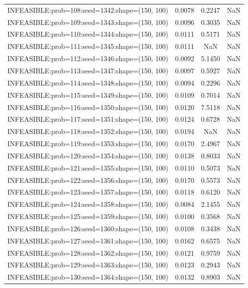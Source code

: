 \begin{longtable}{lccc}
INFEASIBLE:prob=108:seed=1342:shape=(150, 100) & 0.0078 &  0.2247 &    NaN \\
INFEASIBLE:prob=109:seed=1343:shape=(150, 100) & 0.0096 &  0.3035 &    NaN \\
INFEASIBLE:prob=110:seed=1344:shape=(150, 100) & 0.0111 &  0.5171 &    NaN \\
INFEASIBLE:prob=111:seed=1345:shape=(150, 100) & 0.0111 &     NaN &    NaN \\
INFEASIBLE:prob=112:seed=1346:shape=(150, 100) & 0.0092 &  5.1450 &    NaN \\
INFEASIBLE:prob=113:seed=1347:shape=(150, 100) & 0.0097 &  0.5927 &    NaN \\
INFEASIBLE:prob=114:seed=1348:shape=(150, 100) & 0.0094 &  0.2296 &    NaN \\
INFEASIBLE:prob=115:seed=1349:shape=(150, 100) & 0.0109 &  0.7014 &    NaN \\
INFEASIBLE:prob=116:seed=1350:shape=(150, 100) & 0.0120 &  7.5118 &    NaN \\
INFEASIBLE:prob=117:seed=1351:shape=(150, 100) & 0.0124 &  0.6728 &    NaN \\
INFEASIBLE:prob=118:seed=1352:shape=(150, 100) & 0.0194 &     NaN &    NaN \\
INFEASIBLE:prob=119:seed=1353:shape=(150, 100) & 0.0170 &  2.4967 &    NaN \\
INFEASIBLE:prob=120:seed=1354:shape=(150, 100) & 0.0138 &  0.8033 &    NaN \\
INFEASIBLE:prob=121:seed=1355:shape=(150, 100) & 0.0110 &  0.5073 &    NaN \\
INFEASIBLE:prob=122:seed=1356:shape=(150, 100) & 0.0170 &  0.5573 &    NaN \\
INFEASIBLE:prob=123:seed=1357:shape=(150, 100) & 0.0118 &  0.6120 &    NaN \\
INFEASIBLE:prob=124:seed=1358:shape=(150, 100) & 0.0084 &  2.1455 &    NaN \\
INFEASIBLE:prob=125:seed=1359:shape=(150, 100) & 0.0100 &  0.3568 &    NaN \\
INFEASIBLE:prob=126:seed=1360:shape=(150, 100) & 0.0108 &  0.3438 &    NaN \\
INFEASIBLE:prob=127:seed=1361:shape=(150, 100) & 0.0162 &  0.6575 &    NaN \\
INFEASIBLE:prob=128:seed=1362:shape=(150, 100) & 0.0121 &  0.9759 &    NaN \\
INFEASIBLE:prob=129:seed=1363:shape=(150, 100) & 0.0123 &  0.2943 &    NaN \\
INFEASIBLE:prob=130:seed=1364:shape=(150, 100) & 0.0132 &  0.8903 &    NaN \\

\end{longtable}
